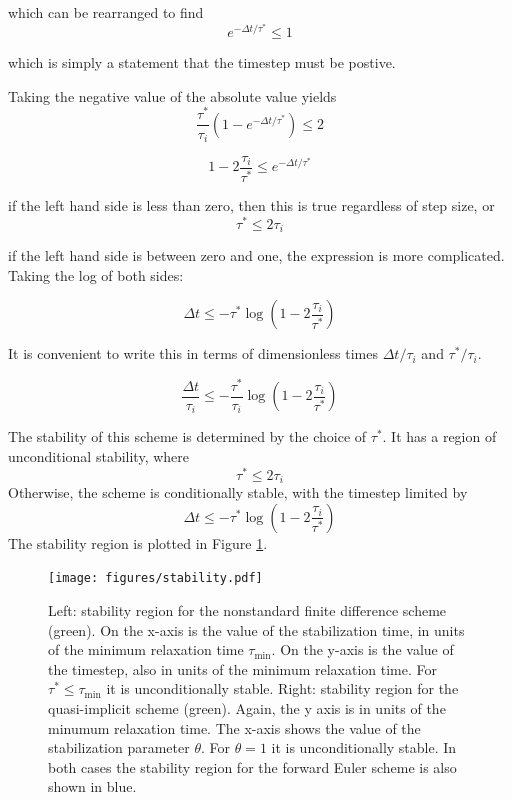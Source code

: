 \documentclass[preprint,12pt,authoryear]{elsarticle}
\begin{document}
which can be rearranged to find
\begin{equation}
e^{-\Delta t/\tau^*} \le 1
\end{equation}

which is simply a statement that the timestep must be postive.

Taking the negative value of the absolute value yields
\begin{equation}
  \frac{\tau^*}{\tau_i} \left(1-e^{-\Delta t/\tau^*} \right)  \le 2
\end{equation}

\begin{equation}
 1 - 2 \frac{\tau_i}{\tau^*} \le e^{-\Delta t/\tau^*}
\end{equation}

if the left hand side is less than zero, then this is true regardless of step size, or
\begin{equation}
\tau^* \le 2 \tau_i
\end{equation}

if the left hand side is between zero and one, the expression is more complicated. 
Taking the log of both sides:

\begin{equation}
\Delta t \le -\tau^* \log \left(1 - 2 \frac{\tau_i}{\tau^*} \right)
\end{equation}

It is convenient to write this in terms of dimensionless times $\Delta t/ \tau_i$ and $\tau^*/\tau_i$.

\begin{equation}
\frac{\Delta t}{\tau_i} \le -\frac{\tau^*}{\tau_i} \log \left(1 - 2 \frac{\tau_i}{\tau^*} \right)
\end{equation}

\fi

The stability of this scheme is determined by the choice of $\tau^*$.  
It has a region of unconditional stability, where
\begin{equation}
\tau^* \le 2 \tau_i
\end{equation}
Otherwise, the scheme is conditionally stable, with the timestep limited by 
\begin{equation}
\Delta t \le -\tau^* \log \left(1 - 2 \frac{\tau_i}{\tau^*} \right)
\end{equation}
The stability region is plotted in Figure \ref{fig:stability}. 

\begin{figure}
\texttt{[image: figures/stability.pdf]}
\label{fig:stability}
\caption{Left: stability region for the nonstandard finite difference scheme (green). On the x-axis is the value of the stabilization time, in units of the minimum relaxation time $\tau_{\mathrm{min}}$.  On the y-axis is the value of the timestep, also in units of the minimum relaxation time. For $\tau^*\le \tau_{\mathrm{min}}$ it is unconditionally stable.  Right: stability region for the quasi-implicit scheme (green).  Again, the y axis is in units of the minumum relaxation time.  The x-axis shows the value of the stabilization parameter $\theta$. For $\theta = 1$ it is unconditionally stable. In both cases the stability region for the forward Euler scheme is also shown in blue.}
\end{figure}
\end{document}
